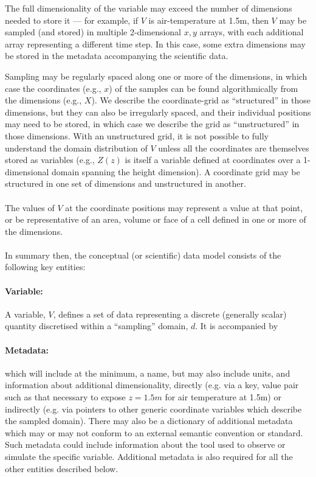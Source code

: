 The full dimensionality of the variable may exceed the number of dimensions needed to store it --- for example, if $V$ is air-temperature at 1.5m, then $V$ may be sampled (and stored) in multiple 2-dimensional $x,y$ arrays, with each additional array representing a different time step.
In this case, some extra dimensions may be stored in the metadata accompanying the scientific data.



Sampling may be regularly spaced along one or more of the dimensions, in which case the coordinates (e.g., $x$) of the samples can be found algorithmically from the dimensions (e.g., $X$). We describe the coordinate-grid as ``structured'' in those dimensions, but they can also be irregularly spaced, and their individual positions may need to be stored, in which case we describe the grid as ``unstructured'' in those dimensions.
With an unstructured grid, it is not possible to fully understand the domain distribution of $V$ unless all the coordinates are themselves stored as variables (e.g., $Z(z)$ is itself a variable defined at coordinates over a 1-dimensional domain spanning the height dimension).  A coordinate grid may be structured in one set of dimensions and unstructured in another.

\paragraph{}The values of $V$ at the coordinate positions may represent a value at that point, or be representative of an area, volume or face of a cell defined in one or more of the dimensions.

\paragraph{}In summary then, the conceptual (or scientific) data model consists of the following key entities:

\paragraph {Variable:} A variable, $V$, defines a set of data representing a discrete (generally scalar) quantity discretised within a ``sampling'' domain, $d$.  It is accompanied by

\paragraph {Metadata:} which will include at the minimum, a name, but may also include units, and information about additional dimensionality, directly (e.g. via a key, value pair such as that necessary to expose $z=1.5m$ for air temperature at 1.5m) or indirectly (e.g. via pointers to other generic coordinate variables which describe the sampled domain).   There may also be a dictionary of additional metadata which may or may not conform to an external semantic convention or standard.  Such metadata could include information about the tool used to observe or simulate the specific variable.  Additional metadata is also required for all the other entities described below.

